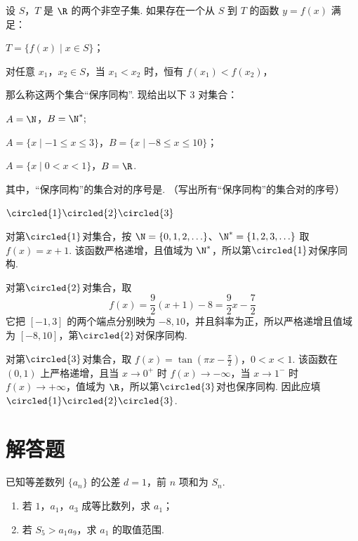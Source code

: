\begin{problem}
设 \(S\)，\(T\) 是 \(\R\) 的两个非空子集. 如果存在一个从 \(S\) 到 \(T\) 的函数 \(y = f(x)\) 满足：
\begin{circlelist}
\item \(T = \{f(x)\mid x\in S\}\)；
\item 对任意 \(x_{1}\)，\(x_{2} \in S\)，当 \(x_{1} < x_{2}\) 时，恒有 \(f(x_{1}) < f(x_{2})\)，
\end{circlelist}
那么称这两个集合“保序同构”. 现给出以下 3 对集合：

\begin{circlelist}
\item \(A = \N\)，\(B = \N^{*};\)
\item \(A = \{x\mid -1\leqslant x\leqslant 3\}\)，\(B = \{x\mid -8\leqslant x\leqslant 10\}\)；
\item \( A = \{x \mid 0 < x < 1\} \)，\( B = \R \).
\end{circlelist}
其中，“保序同构”的集合对的序号是\fillinblank{}. （写出所有“保序同构”的集合对的序号）

\begin{answer}
\(\circled{1}\circled{2}\circled{3}\)
\end{answer}

\begin{solution}
对第\(\circled{1}\)对集合，按 \(\N=\{0,1,2,\ldots\}\)、\(\N^{*}=\{1,2,3,\ldots\}\) 取 \(f(x)=x+1\). 该函数严格递增，且值域为 \(\N^{*}\)，所以第\(\circled{1}\)对保序同构.

对第\(\circled{2}\)对集合，取
\[
f(x)=\frac92(x+1)-8=\frac92x-\frac72
\]
它把 \([-1,3]\) 的两个端点分别映为 \(-8,10\)，并且斜率为正，所以严格递增且值域为 \([-8,10]\)，第\(\circled{2}\)对保序同构.

对第\(\circled{3}\)对集合，取
\(f(x)=\tan\left(\pi x-\frac\pi2\right)\)，\(0<x<1\).
该函数在 \((0,1)\) 上严格递增，且当 \(x\to0^+\) 时 \(f(x)\to-\infty\)，当 \(x\to1^-\) 时 \(f(x)\to+\infty\)，值域为 \(\R\)，所以第\(\circled{3}\)对也保序同构. 因此应填 \(\circled{1}\circled{2}\circled{3}\).
\end{solution}
\end{problem}

\section{解答题}

\begin{problem}
已知等差数列 \(\{a_{n}\}\) 的公差 \(d = 1\)，前 \(n\) 项和为 \(S_{n}\).
\begin{enumerate}
\item 若 \(1\)，\(a_{1}\)，\(a_{3}\) 成等比数列，求 \(a_{1}\)；
\item 若 \(S_{5} > a_{1}a_{9}\)，求 \(a_{1}\) 的取值范围.
\end{enumerate}
\end{problem}


